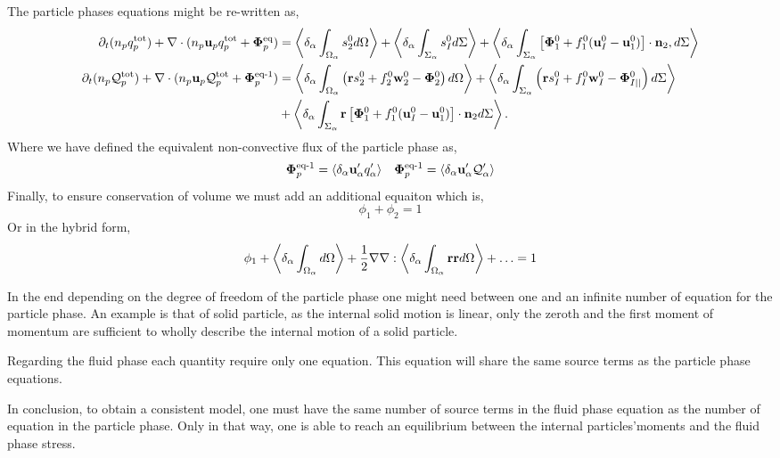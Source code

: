 The particle phases equations might be re-written as, 
\begin{align}
    \partial_t (n_p  q_p^\text{tot})
    + \mathbf{\nabla}\cdot (n_p\textbf{u}_p q_p^\text{tot} + \bm\Phi_p^\text{eq})
    &= \left<\delta_\alpha \int_{\Omega_\alpha}  s_2^0  d\Omega\right>
    + \left<\delta_\alpha \int_{\Sigma_\alpha}  s_I^0  d\Sigma\right>
    + \left<\delta_\alpha \int_{\Sigma_\alpha}  \left[\mathbf{\Phi}_1^0 + f_1^0 (\textbf{u}_I^0-\textbf{u}_1^0) \right] \cdot \textbf{n}_2 , d\Sigma\right>
    \\
    \partial_t (n_p  \mathcal{Q}_p^\text{tot})
    + \mathbf{\nabla}\cdot (n_p \textbf{u}_p\mathcal{Q}_p^\text{tot}
    + \bm\Phi_p^\text{eq-1})
    &=\left<\delta_\alpha \int_{\Omega_\alpha}  \left(
        \textbf{r} s_2^0         
        + f_2^0  \textbf{w}_2^0 
        - \mathbf{\Phi}_2^0
    \right)  d\Omega\right>
    + \left<\delta_\alpha \int_{\Sigma_\alpha}  \left(
        \textbf{r}s_I^0
        + f_I^0 \textbf{w}_I^0
        - \mathbf{\Phi}_{I||}^0
    \right)  d\Sigma\right>\nonumber\\
    &+ \left<\delta_\alpha \int_{\Sigma_\alpha}  \textbf{r} \left[
        \mathbf{\Phi}_1^0
        + f_1^0 (\textbf{u}_I^0-\textbf{u}_1^0)
    \right]\cdot \textbf{n}_2   d\Sigma\right>.
\end{align}
Where we have defined the equivalent non-convective flux of the particle phase as, 
\begin{align*}
    \bm\Phi_p^\text{eq-1}= \left<\delta_\alpha \textbf{u}_\alpha' q_\alpha'\right>
    && \bm\Phi_p^\text{eq-1}= \left<\delta_\alpha \textbf{u}_\alpha' \mathcal{Q}_\alpha'\right>
\end{align*}
Finally, to ensure conservation of volume we must add an additional equaiton which is, 
\begin{equation}
    \phi_1 + \phi_2 = 1
\end{equation}
Or in the hybrid form, 
\begin{equation}
    \phi_1 + \left<\delta_\alpha \int_{\Omega_\alpha}  d\Omega\right> +\frac{1}{2} \mathbf{\nabla}\mathbf{\nabla} : \left<\delta_\alpha \int_{\Omega_\alpha} \textbf{rr} d\Omega\right> + \ldots = 1
\end{equation}



In the end depending on the degree of freedom of the particle phase one might need between one and an infinite number of equation for the particle phase. 
An example is that of solid particle, as the internal solid motion is linear, only the zeroth and the first moment of momentum are sufficient to wholly describe the internal motion of a solid particle. 

Regarding the fluid phase each quantity require only one equation. 
This equation will share the same source terms as the particle phase equations. 


In conclusion, to obtain a consistent model, one must have the same number of source terms in the fluid phase equation as the number of equation in the particle phase. 
Only in that way, one is able to reach an equilibrium between the internal particles'moments and the fluid phase stress. 



